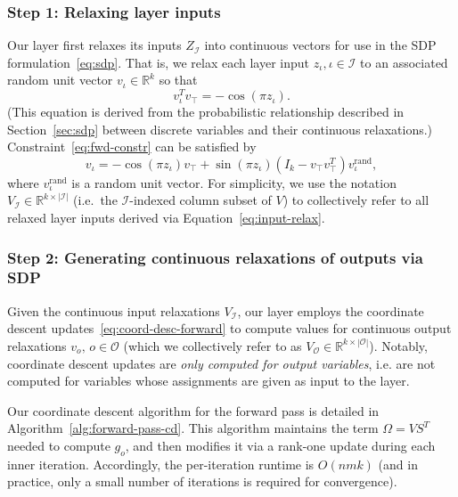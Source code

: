 \documentclass{article}
\newcommand{\inndex}{\iota}
\newcommand{\outdex}{o}
\newcommand{\truthvar}{\top}
\newcommand{\inset}{\mathcal{I}}
\newcommand{\outset}{\mathcal{O}}
\begin{document}
	\subsubsection{Step 1: Relaxing layer inputs}
	\label{sec:input-relax}
	Our layer first relaxes its inputs $Z_{\inset}$ into continuous vectors for use in the SDP formulation~\eqref{eq:sdp}.
	That is, we relax each layer input $z_\inndex, \inndex \in \inset$ to an associated 
	random unit vector $v_\inndex \in \mathbb{R}^k$ so that
        \begin{equation}
                v_{\inndex}^T v_{\truthvar} = -\cos(\pi z_{\inndex}).
                \label{eq:fwd-constr}
        \end{equation}
        (This equation is derived from the probabilistic relationship described in Section~\ref{sec:sdp} between discrete variables and their continuous relaxations.)
Constraint~\eqref{eq:fwd-constr} can be satisfied by 
\begin{equation}
		\label{eq:input-relax}
                v_{\inndex} = -\cos(\pi z_{\inndex})v_{\truthvar} + \sin(\pi z_{\inndex})(I_k-v_{\truthvar}v_{\truthvar}^T)v^{\text{rand}}_{\inndex},
	\end{equation}
        where $v^{\text{rand}}_{\inndex}$ is a random unit vector.
	For simplicity, we use the notation $V_{\inset} \in \mathbb{R}^{k \times |\inset|}$ (i.e.~the $\inset$-indexed column subset of $V$) to collectively refer to all relaxed layer inputs derived via Equation~\eqref{eq:input-relax}.
	
	\subsubsection{Step 2: Generating continuous relaxations of outputs via SDP}
	\label{sec:sdp-fwd}
	
	Given the continuous input relaxations 
	$V_{\inset}$,
our layer employs the coordinate descent updates~\eqref{eq:coord-desc-forward} to compute values for continuous output relaxations $v_{\outdex}, \, \outdex \in \outset$ (which we collectively refer to as $V_{\outset} \in \mathbb{R}^{k \times |\outset|}$).
Notably, coordinate descent updates are \emph{only computed for output variables}, i.e. are not computed for variables whose assignments are given as input to the layer.
	
	


	Our coordinate descent algorithm for the forward pass is detailed in Algorithm~\ref{alg:forward-pass-cd}.
	This algorithm maintains the term $\Omega = VS^T$ needed to compute $g_{\outdex}$, and then modifies it via a rank-one update during each inner iteration.
	Accordingly, the per-iteration runtime is $O(nmk)$ (and in practice, only a small number of iterations is required for convergence).
	
\end{document}
